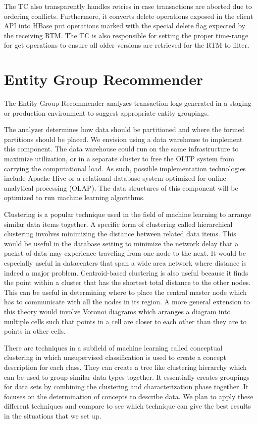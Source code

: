 \documentclass[10pt,final,journal]{IEEEtran}
\begin{document}
The TC also transparently handles retries in case transactions are aborted due to ordering conflicts. Furthermore, it converts delete operations exposed in the client API into HBase put operations marked with the special delete flag expected by the receiving RTM. The TC is also responsible for setting the proper time-range for get operations to ensure all older versions are retrieved for the RTM to filter.

\section{Entity Group Recommender}
The Entity Group Recommender analyzes transaction logs generated in a staging or production environment to suggest appropriate entity groupings.

The analyzer determines how data should be partitioned and where the formed partitions should be placed. We envision using a data warehouse to implement this component. The data warehouse could run on the same infrastructure to maximize utilization, or in a separate cluster to free the OLTP system from carrying the computational load. As such, possible implementation technologies include Apache Hive or a relational database system optimized for online analytical processing (OLAP). The data structures of this component will be optimized to run machine learning algorithms.

Clustering is a popular technique used in the field of machine learning to arrange similar data items together.  A specific form of clustering called hierarchical clustering involves minimizing the distance between related data items.  This would be useful in the database setting to minimize the network delay that a packet of data may experience traveling from one node to the next.  It would be especially useful in datacenters that span a wide area network where distance is indeed a major problem.  Centroid-based clustering is also useful because it finds the point within a cluster that has the shortest total distance to the other nodes.  This can be useful in determining where to place the central master node which has to communicate with all the nodes in its region.  A more general extension to this theory would involve Voronoi diagrams which arranges a diagram into multiple cells such that points in a cell are closer to each other than they are to points in other cells.

There are techniques in a subfield of machine learning called conceptual clustering in which unsupervised classification is used to create a concept description for each class. They can create a tree like clustering hierarchy which can be used to group similar data types together. It essentially creates groupings for data sets by combining the clustering and characterization phase together. It focuses on the determination of concepts to describe data. We plan to apply these different techniques and compare to see which technique can give the best results in the situations that we set up.
\end{document}
